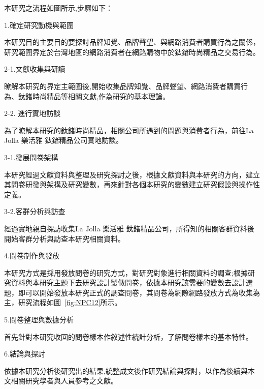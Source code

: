  本研究之流程如圖所示,步驟如下：

1.確定研究動機與範圍

         本研究目的主要目的要探討品牌知覺、品牌聲望、與網路消費者購買行為之關係，研究範圍界定於台灣地區的網路消費者在網路購物中於鈦鍺時尚精品之交易行為。

2-1.文獻收集與研讀

        瞭解本研究的界定主範圍後,開始收集品牌知覺、品牌聲望、網路消費者購買行為、鈦鍺時尚精品等相關文獻,作為研究的基本理論。

2-2. 進行實地訪談

        為了瞭解本研究的鈦鍺時尚精品，相關公司所遇到的問題與消費者行為，前往La Jolla 樂活雅 鈦鍺精品公司實地訪談。

3-1.發展問卷架構

       本研究經過文獻資料與整理及研究探討之後，根據文獻資料與本研究的方向，建立其問卷研發與架構及研究變數，再來針對各個本研究的變數建立研究假設與操作性定義。

3-2.客群分析與訪查

      經過實地親自探訪收集La Jolla 樂活雅 鈦鍺精品公司，所得知的相關客群資料後開始客群分析與訪查本研究相關資料。

4.問卷制作與發放

      本研究方式是採用發放問卷的研究方式，對研究對象進行相關資料的調查;根據研究資料與本研究主題下去研究設計製做問卷，依據本研究該需要的變數去設計選題，即可以開始發放本研究正式的調查問卷，其問卷為網際網路發放方式為收集為主，研究流程如圖~\ref{fig:NPC12}所示。

5.問卷整理與數據分析

      首先針對本研究收回的問卷樣本作敘述性統計分析，了解問卷樣本的基本特性。

6.結論與探討

     依據本研究分析後研究出的結果,統整成文後作研究結論與探討，以作為後續與本文相關研究學者與人員參考之文獻。

